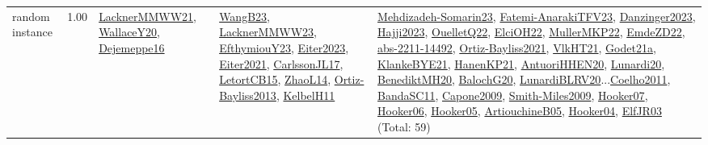 {\begin{longtable}{p{3cm}r>{\raggedright\arraybackslash}p{6cm}>{\raggedright\arraybackslash}p{6cm}>{\raggedright\arraybackslash}p{8cm}}
\index{random instance}\index{Benchmarks!random instance}random instance &  1.00 & \hyperref[detail:LacknerMMWW21]{LacknerMMWW21}, \hyperref[detail:WallaceY20]{WallaceY20}, \hyperref[detail:Dejemeppe16]{Dejemeppe16} & \hyperref[detail:WangB23]{WangB23}, \hyperref[detail:LacknerMMWW23]{LacknerMMWW23}, \hyperref[detail:EfthymiouY23]{EfthymiouY23}, \hyperref[detail:Eiter2023]{Eiter2023}, \hyperref[detail:Eiter2021]{Eiter2021}, \hyperref[detail:CarlssonJL17]{CarlssonJL17}, \hyperref[detail:LetortCB15]{LetortCB15}, \hyperref[detail:ZhaoL14]{ZhaoL14}, \hyperref[detail:Ortiz-Bayliss2013]{Ortiz-Bayliss2013}, \hyperref[detail:KelbelH11]{KelbelH11} & \hyperref[detail:Mehdizadeh-Somarin23]{Mehdizadeh-Somarin23}, \hyperref[detail:Fatemi-AnarakiTFV23]{Fatemi-AnarakiTFV23}, \hyperref[detail:Danzinger2023]{Danzinger2023}, \hyperref[detail:Hajji2023]{Hajji2023}, \hyperref[detail:OuelletQ22]{OuelletQ22}, \hyperref[detail:ElciOH22]{ElciOH22}, \hyperref[detail:MullerMKP22]{MullerMKP22}, \hyperref[detail:EmdeZD22]{EmdeZD22}, \hyperref[detail:abs-2211-14492]{abs-2211-14492}, \hyperref[detail:Ortiz-Bayliss2021]{Ortiz-Bayliss2021}, \hyperref[detail:VlkHT21]{VlkHT21}, \hyperref[detail:Godet21a]{Godet21a}, \hyperref[detail:KlankeBYE21]{KlankeBYE21}, \hyperref[detail:HanenKP21]{HanenKP21}, \hyperref[detail:AntuoriHHEN20]{AntuoriHHEN20}, \hyperref[detail:Lunardi20]{Lunardi20}, \hyperref[detail:BenediktMH20]{BenediktMH20}, \hyperref[detail:BalochG20]{BalochG20}, \hyperref[detail:LunardiBLRV20]{LunardiBLRV20}...\hyperref[detail:Coelho2011]{Coelho2011}, \hyperref[detail:BandaSC11]{BandaSC11}, \hyperref[detail:Capone2009]{Capone2009}, \hyperref[detail:Smith-Miles2009]{Smith-Miles2009}, \hyperref[detail:Hooker07]{Hooker07}, \hyperref[detail:Hooker06]{Hooker06}, \hyperref[detail:Hooker05]{Hooker05}, \hyperref[detail:ArtiouchineB05]{ArtiouchineB05}, \hyperref[detail:Hooker04]{Hooker04}, \hyperref[detail:ElfJR03]{ElfJR03} (Total: 59)\\

\end{longtable}}
